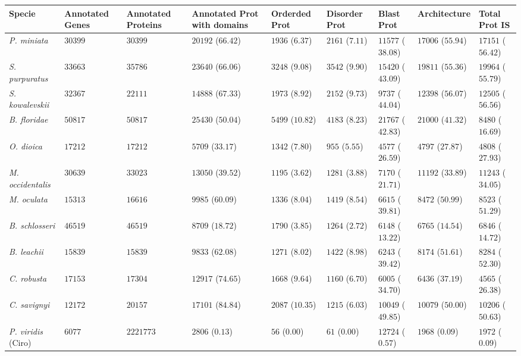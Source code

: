 \documentclass[11pt]{article}
\begin{document}
\begin{table}
\small
\centering
\begin{tabular}{p{3.2cm}p{2cm}p{2cm}p{2cm}p{2cm}p{2cm}p{2.1cm}p{2.7cm}p{2.6cm}}
\toprule
\textbf{Specie}&\textbf{Annotated Genes}&\textbf{Annotated Proteins}&\textbf{Annotated Prot with domains}&\textbf{Orderded Prot}&\textbf{Disorder Prot}&\textbf{Blast Prot}&\textbf{Architecture}&\textbf{Total Prot IS} \\ 
\midrule
\textsl{P. miniata}&$30399$&$30399$&$20192$ ($66.42$)&$1936$ ($6.37$)&$2161$ ($7.11$)&$11577$ ($38.08$)&$17006$ ($55.94$)&$17151$ ($56.42$)\\
\textsl{S. purpuratus}&$33663$&$35786$&$23640$ ($66.06$)&$3248$ ($9.08$)&$3542$ ($9.90$)&$15420$ ($43.09$)&$19811$ ($55.36$)&$19964$ ($55.79$)\\
\textsl{S. kowalevskii}&$32367$&$22111$&$14888$ ($67.33$)&$1973$ ($8.92$)&$2152$ ($9.73$)&$9737$ ($44.04$)&$12398$ ($56.07$)&$12505$ ($56.56$)\\
\midrule
\textsl{B. floridae}&$50817$&$50817$&$25430$ ($50.04$)&$5499$ ($10.82$)&$4183$ ($8.23$)&$21767$ ($42.83$)&$21000$ ($41.32$)&$8480$ ($16.69$)\\
\midrule
\textsl{O. dioica}&$17212$&$17212$&$5709$ ($33.17$)&$1342$ ($7.80$)&$955$ ($5.55$)&$4577$ ($26.59$)&$4797$ ($27.87$)&$4808$ ($27.93$)\\
\textsl{M. occidentalis}&$30639$&$33023$&$13050$ ($39.52$)&$1195$ ($3.62$)&$1281$ ($3.88$)&$7170$ ($21.71$)&$11192$ ($33.89$)&$11243$ ($34.05$)\\
\textsl{M. oculata}&$15313$&$16616$&$9985$ ($60.09$)&$1336$ ($8.04$)&$1419$ ($8.54$)&$6615$ ($39.81$)&$8472$ ($50.99$)&$8523$ ($51.29$)\\
\textsl{B. schlosseri}&$46519$&$46519$&$8709$ ($18.72$)&$1790$ ($3.85$)&$1264$ ($2.72$)&$6148$ ($13.22$)&$6765$ ($14.54$)&$6846$ ($14.72$)\\
\textsl{B. leachii }&$15839$&$15839$&$9833$ ($62.08$)&$1271$ ($8.02$)&$1422$ ($8.98$)&$6243$ ($39.42$)&$8174$ ($51.61$)&$8284$ ($52.30$)\\
\textsl{C. robusta}&$17153$&$17304$&$12917$ ($74.65$)&$1668$ ($9.64$)&$1160$ ($6.70$)&$6005$ ($34.70$)&$6436$ ($37.19$)&$4565$ ($26.38$)\\
\textsl{C. savignyi}&$12172$&$20157$&$17101$ ($84.84$)&$2087$ ($10.35$)&$1215$ ($6.03$)&$10049$ ($49.85$)&$10079$ ($50.00$)&$10206$ ($50.63$)\\
\textsl{P. viridis} (Ciro)&$6077$&$2221773$&$2806$ ($0.13$)&$56$ ($0.00$)&$61$ ($0.00$)&$12724$ ($0.57$)&$1968$ ($0.09$)&$1972$ ($0.09$)\\

\end{tabular}
\end{table}
\end{document}
